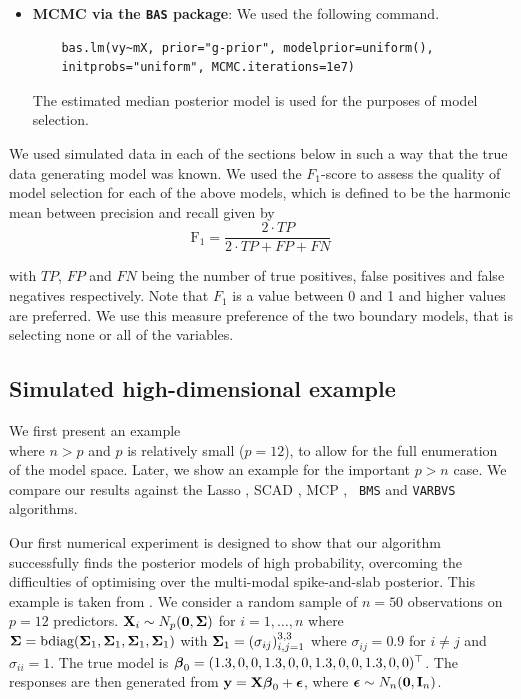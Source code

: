\begin{itemize}
	\item {\bf MCMC via the {\tt BAS} package}: We used the following command.
	\begin{verbatim}
	bas.lm(vy~mX, prior="g-prior", modelprior=uniform(), 
    initprobs="uniform", MCMC.iterations=1e7)
	\end{verbatim}
	
	\noindent 
    The estimated median posterior model is used for the purposes of model
    selection.
	
\end{itemize}

We used simulated data in each of the sections below in such a way that the
true data generating model was known. We used the $F_1$-score
\citep[see][]{Van_Rijsbergen1979} to assess the quality of model selection for
each of the above models, which is defined to be the harmonic mean between
precision and recall given by
$$
\mbox{F}_1 = \frac{2\cdot TP}{2\cdot TP + FP + FN}
$$

\noindent with $TP$, $FP$ and $FN$ being the number of true positives, false
positives and false negatives respectively. Note that $F_1$ is a value between
0 and 1 and higher values are preferred. We use this measure preference of the
two boundary models, that is selecting none or all of the variables. 

\subsection{Simulated high-dimensional example}
\label{sec:highdimensional} 

We first present an example \\ where $n > p$ and $p$ is relatively small ($p =
12$), to allow for the full enumeration of the model space. Later, we show an
example for the important $p > n$ case. We compare our results  against the
Lasso \citep{Tibshirani1996}, SCAD \citep{Fan2001}, MCP \citep{Zhang2010}, {\tt
BMS} \citep{Zeugner2015} and {\tt VARBVS} \citep{Carbonetto2011} algorithms.

Our first numerical experiment is designed to show that our algorithm
successfully finds the posterior models of high probability, overcoming the
difficulties of optimising over the multi-modal spike-and-slab posterior.  This
example is taken from \citep{Rockova2017}.  We consider a random sample of $n =
50$ observations on $p = 12$ predictors. ${\bf X}_i \sim N_p({\bf 0}, {\boldsymbol \Sigma})$ for
$i = 1, \ldots, n$ where ${\boldsymbol \Sigma} = \text{bdiag}({\boldsymbol \Sigma}_1, {\boldsymbol \Sigma}_1,
{\boldsymbol \Sigma}_1, {\boldsymbol \Sigma}_1)$ with ${\boldsymbol \Sigma}_1 = (\sigma_{ij})_{i, j = 1}^{3, 3}$ where
$\sigma_{ij} = 0.9$ for $i \ne j$ and $\sigma_{ii} = 1$.  The true model is
${\boldsymbol \beta}_0 = (1.3, 0, 0, 1.3, 0, 0, 1.3, 0, 0, 1.3, 0, 0)^\top$.  The responses
are then generated from ${\bf y} = {\bf X} {\boldsymbol \beta}_0 + {\boldsymbol \epsilon}$, where ${\boldsymbol \epsilon} \sim
N_n({\bf 0}, {\bf I}_n)$.

